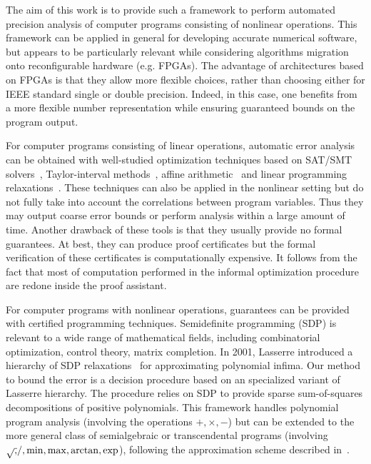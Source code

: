 \documentclass[preprint]{sigplanconf}
\theoremstyle{plain}
\begin{document}
The aim of this work is to provide such a framework to perform automated precision analysis of computer programs consisting of nonlinear operations. 
This framework can be applied in general for developing accurate numerical software, but appears to be particularly relevant while considering algorithms migration onto reconfigurable hardware (e.g. FPGAs). The advantage of architectures based on FPGAs is that they allow more flexible choices, rather than choosing either for IEEE standard single or double precision. Indeed, in this case, one benefits from a more flexible number representation while ensuring guaranteed bounds on the program output. 

For computer programs consisting of linear operations, automatic error analysis can be obtained with well-studied optimization techniques based on SAT/SMT solvers~\cite{Darulova14Popl,hgbk2012fmcad}, Taylor-interval methods~\cite{fptaylor15}, affine arithmetic~\cite{fluctuat} and linear programming relaxations~\cite{Boland10HGR}.
These techniques can also be applied in the nonlinear setting but do not fully take into account the correlations between program variables. Thus they may output coarse error bounds or perform analysis within a large amount of time.  Another drawback of these tools is that they usually provide no formal guarantees. At best, they can produce proof certificates but the formal verification of these certificates is computationally expensive. It follows from the fact that most of computation performed in the informal optimization procedure are redone inside the proof assistant.

For computer programs with nonlinear operations, guarantees can be provided with certified programming techniques.
Semidefinite programming (SDP) is relevant to a wide range of mathematical fields, including combinatorial optimization, control theory, matrix completion. In 2001, Lasserre introduced a hierarchy of SDP relaxations~\cite{Lasserre01moments} for approximating polynomial infima. Our method to bound the error is a decision procedure based on an specialized variant of Lasserre hierarchy. The procedure relies on SDP to provide sparse sum-of-squares decompositions of positive polynomials. This framework handles polynomial program analysis (involving the operations $+,\times,-$) but can be extended to the more general class of semialgebraic or transcendental programs (involving $\sqrtsign, /, \min, \max, \arctan, \exp$), following the approximation scheme described in~\cite{Magron15sdp}.
\end{document}
